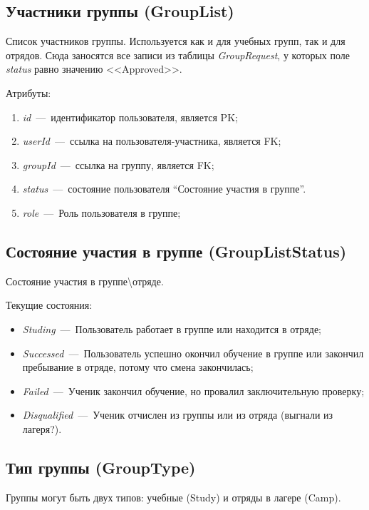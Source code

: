 \documentclass[14pt]{article}
\begin{document}
\subsection{Участники группы (GroupList)}

Список участников группы. Используется как и для учебных групп, так и для отрядов. Сюда заносятся все записи из таблицы \emph{GroupRequest}, у которых поле \emph{status} равно значению <<Approved>>.

Атрибуты:
\begin{enumerate}
	\item \emph{id}~---~идентификатор пользователя, является PK; 
	\item \emph{userId}~---~ссылка на пользователя-участника, является FK;
	\item \emph{groupId}~---~ссылка на группу, является FK;
	\item \emph{status}~---~состояние пользователя ``Состояние участия в группе''.
    \item \emph{role}~---~Роль пользователя в группе;
\end{enumerate}

\subsection{Состояние участия в группе (GroupListStatus)}

Состояние участия в группе\textbackslash отряде.

Текущие состояния:
\begin{itemize}
	\item \emph{Studing}~---~Пользователь работает в группе или находится в отряде; 
	\item \emph{Successed}~---~Пользователь успешно окончил обучение в группе или закончил пребывание в отряде, потому что смена закончилась;
	\item \emph{Failed}~---~Ученик закончил обучение, но провалил заключительную проверку;
	\item \emph{Disqualified}~---~Ученик отчислен из группы или из отряда (выгнали из лагеря?).
\end{itemize}

\subsection{Тип группы (GroupType)}

Группы могут быть двух типов: учебные (Study) и отряды в лагере (Camp).
\end{document}
